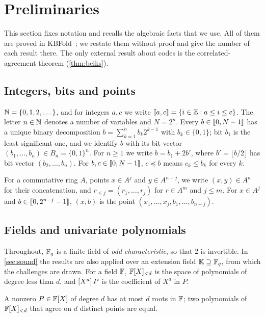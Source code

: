 \section{Preliminaries}\label{sec:prelim}

This section fixes notation and recalls the algebraic facts that we use.
All of them are proved in KBFold~\cite{Mkh26}; we restate them without proof and give the number of each result there.
The only external result about codes is the correlated-agreement theorem (\cref{thm:bciks}).

\subsection{Integers, bits and points}\label{sec:prelim:bits}

$\mathbb{N} = \{0,1,2,\dots\}$, and for integers $a, c$ we write $\llbracket a, c \rrbracket = \{i \in \mathbb{Z} : a \le i \le c\}$.
The letter $n \in \mathbb{N}$ denotes a number of variables and $N = 2^n$.
Every $b \in \llbracket 0, N-1 \rrbracket$ has a unique binary decomposition $b = \sum_{k=1}^n b_k 2^{k-1}$ with $b_k \in \{0,1\}$; bit $b_1$ is the least significant one, and we identify $b$ with its bit vector $(b_1,\dots,b_n) \in B_n = \{0,1\}^n$.
For $n \ge 1$ we write $b = b_1 + 2b'$, where $b' = \lfloor b/2 \rfloor$ has bit vector $(b_2,\dots,b_n)$.
For $b, c \in \llbracket 0, N-1 \rrbracket$, $c \preceq b$ means $c_k \le b_k$ for every $k$.

For a commutative ring $A$, points $x \in A^j$ and $y \in A^{n-j}$, we write $(x,y) \in A^n$ for their concatenation, and $r_{\le j} = (r_1,\dots,r_j)$ for $r \in A^m$ and $j \le m$.
For $x \in A^j$ and $b \in \llbracket 0, 2^{n-j}-1 \rrbracket$, $(x,b)$ is the point $(x_1,\dots,x_j,b_1,\dots,b_{n-j})$.

\subsection{Fields and univariate polynomials}\label{sec:prelim:fields}

Throughout, $\mathbb{F}_q$ is a finite field of \emph{odd characteristic}, so that $2$ is invertible.
In \cref{sec:sound} the results are also applied over an extension field $\mathbb{K} \supseteq \mathbb{F}_q$, from which the challenges are drawn.
For a field $\mathbb{F}$, $\mathbb{F}[X]_{<d}$ is the space of polynomials of degree less than $d$, and $[X^{a}]\,P$ is the coefficient of $X^a$ in $P$.

\begin{lemma}\label{lem:roots}
A nonzero $P \in \mathbb{F}[X]$ of degree $d$ has at most $d$ roots in $\mathbb{F}$; two polynomials of $\mathbb{F}[X]_{<d}$ that agree on $d$ distinct points are equal.
\end{lemma}

